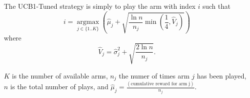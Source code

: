 The UCB1-Tuned strategy is simply to play the arm with index $i$ such that
\begin{displaymath}
    i = \operatorname*{argmax}_{j \in \{ 1..K \}} \left(\hat{\mu}_j + 
    \sqrt{\frac{\ln{n}}{n_j} \min(\frac{1}{4},\hat{V}_j)}\right)
\end{displaymath}
where 
\begin{displaymath}
    \hat{V}_j = \hat{\sigma}_j^2 + \sqrt{\frac{2\ln{n}}{n_j}}\text{.}
\end{displaymath}

$K$ is the number of available arms, $n_j$ the numer of times arm $j$ has 
been played, $n$ is the total number of plays, and $\hat{\mu}_j 
=\frac{(\text{cumulative reward for arm j})}{n_j}$.

% 
% 
% 
% 
% 
% 

